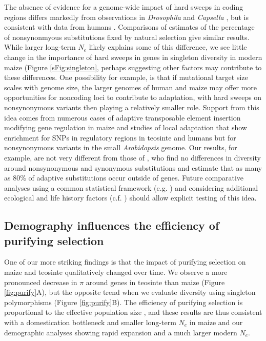 \documentclass{pnastwo}
\begin{document}
\begin{article}
The absence of evidence for a genome-wide impact of hard sweeps in coding regions differs markedly from observations in \emph{Drosophila} \cite{sattath2011} and \emph{Capsella} \cite{williamson2014}, but is consistent with data from humans \cite{hernandez2011,pritchard2010genetics}.
Comparisons of estimates of the percentage of nonsynonmyous substitutions fixed by natural selection \cite{ross2009,sella2009,eyre2009estimating,williamson2014} give similar results. 
While larger long-term $N_e$ likely explains some of this difference, we see little change in the importance of hard sweeps in genes in singleton diversity in modern maize (Figure \ref{sFig:singleton}, perhaps suggesting other factors may contribute to these differences.  
One possibility for example, is that if mutational target size scales with genome size, the larger genomes of human and maize may offer more opportunities for noncoding loci to contribute to adaptation, with hard sweeps on nonsynonymous variants then playing a relatively smaller role. 
Support from this idea comes from numerous cases of adaptive transposable element insertion modifying gene regulation in maize \cite{studer2011,castelletti2014mite,mao2015,yang2013} and studies of local adaptation that show enrichment for SNPs in regulatory regions in teosinte \cite{pyhajarvi2013} and humans \cite{fraser2013gene} but for nonsynonymous variants in the small \emph{Arabidopsis} genome.  
Our results, for example, are not very different from those of \cite{Halligan:2013ir}, who find no differences in diversity around nonsynonymous and synonymous substitutions and estimate that as many as 80\% of adaptive substitutions occur outside of genes.  
Future comparative analyses using a common statistical framework (e.g. \cite{corbett2015}) and considering additional ecological and life history factors (c.f. \cite{leffler2012}) should allow explicit testing of this idea.

\subsection{Demography influences the efficiency of purifying selection} %
One of our more striking findings is that the impact of purifying selection on maize and teosinte qualitatively changed over time. 
We observe a more pronounced decrease in $\pi$ around genes in teosinte than maize (Figure \ref{fig:purify}A), but the opposite trend when we evaluate diversity using singleton polymorphisms (Figure \ref{fig:purify}B).
The efficiency of purifying selection is proportional to the effective population size \cite{kimura1984}, and these results are thus consistent with a domestication bottleneck and smaller long-term $N_e$ in maize \cite{eyre1998, tenaillon2004, wright2005, ross2009} and our demographic analyses showing rapid expansion and a much larger modern $N_e$.  


\end{article}
\end{document}
